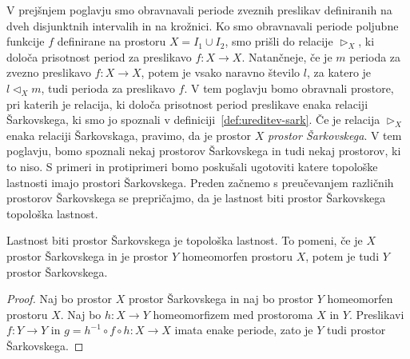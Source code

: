 \documentclass[../TG_magistrsko_delo_sections.tex]{subfiles}
\begin{document}
V prejšnjem poglavju smo obravnavali periode zveznih preslikav definiranih na dveh disjunktnih intervalih in na krožnici. Ko smo obravnavali periode poljubne funkcije $f$ definirane na prostoru $X = I_1 \cup I_2$, smo prišli do relacije $\triangleright_X$, ki določa prisotnost period za preslikavo $f \colon X \to X$. Natančneje, če je $m$ perioda za zvezno preslikavo $f \colon X \to X$, potem je vsako naravno število $l$, za katero je $l \triangleleft_X m$, tudi perioda za preslikavo $f$. V tem poglavju bomo obravnali prostore, pri katerih je relacija, ki določa prisotnost period preslikave enaka relaciji Šarkovskega, ki smo jo spoznali v definiciji~\ref{def:ureditev-sark}. Če je relacija $\triangleright_X$ enaka relaciji Šarkovskaga, pravimo, da je prostor $X$ \emph{prostor Šarkovskega}. V tem poglavju, bomo spoznali nekaj prostorov Šarkovskega in tudi nekaj prostorov, ki to niso. S primeri in protiprimeri bomo poskušali ugotoviti katere topološke lastnosti imajo prostori Šarkovskega.
Preden začnemo s preučevanjem različnih prostorov Šarkovskega se prepričajmo, da je lastnost biti prostor Šarkovskega topološka lastnost. 
\begin{trditev}
Lastnost biti prostor Šarkovskega je topološka lastnost. To pomeni, če je $X$ prostor Šarkovskega in je prostor $Y$ homeomorfen prostoru $X$, potem je tudi $Y$ prostor Šarkovskega.
\end{trditev}
\begin{proof}
Naj bo prostor $X$ prostor Šarkovskega in naj bo prostor $Y$ homeomorfen prostoru $X$. Naj bo $h \colon X \to Y$ homeomorfizem med prostoroma $X$ in $Y$. Preslikavi $f \colon Y \to Y$ in $g = h^{-1} \circ f \circ h \colon X \to X$ imata enake periode, zato je $Y$ tudi prostor Šarkovskega.
\end{proof}



\end{document}
